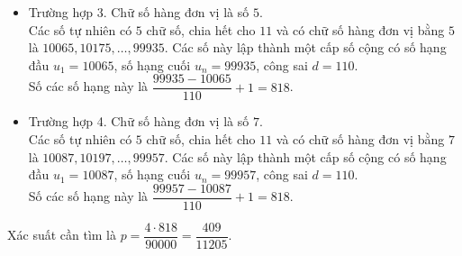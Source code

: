 \begin{vd}
{\begin{itemize}
			Các số tự nhiên có $5$ chữ số, chia hết cho $11$ và có chữ số hàng đơn vị bằng $3$ là $10043, 10153, \ldots, 99913$. Các số này lập thành một cấp số cộng có số hạng đầu $u_1=10043$, số hạng cuối $u_n = 99913$, công sai $d=110$.\\
			Số các số hạng này là $\dfrac{99913 - 10043}{110}+1=818$.
			\item Trường hợp 3. Chữ số hàng đơn vị là số $5$.\\
			Các số tự nhiên có $5$ chữ số, chia hết cho $11$ và có chữ số hàng đơn vị bằng $5$ là $10065, 10175, \ldots, 99935$. Các số này lập thành một cấp số cộng có số hạng đầu $u_1=10065$, số hạng cuối $u_n = 99935$, công sai $d=110$.\\
			Số các số hạng này là $\dfrac{99935 - 10065}{110}+1=818$.
			\item Trường hợp 4. Chữ số hàng đơn vị là số $7$.\\
			Các số tự nhiên có $5$ chữ số, chia hết cho $11$ và có chữ số hàng đơn vị bằng $7$ là $10087, 10197, \ldots, 99957$. Các số này lập thành một cấp số cộng có số hạng đầu $u_1=10087$, số hạng cuối $u_n = 99957$, công sai $d=110$.\\
			Số các số hạng này là $\dfrac{99957 - 10087}{110}+1=818$.
		\end{itemize}
		Xác suất cần tìm là $p=\dfrac{4\cdot 818}{90000} =\dfrac{409}{11205}$.
	}
\end{vd}
